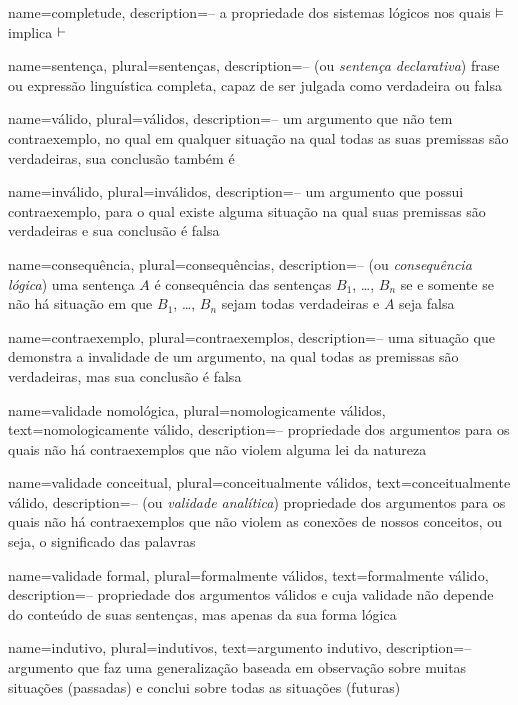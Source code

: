 {
 name=completude,
 description={-- a propriedade dos sistemas lógicos nos quais $\vDash $ implica $\vdash$}
}

{
 name=sentença,
 plural=sentenças,
 description={-- (ou \textit{sentença declarativa}) frase ou expressão linguística completa, capaz de ser julgada como verdadeira ou falsa}
}

{
 name=válido,
 plural=válidos,
 description={-- um argumento que não tem contraexemplo, no qual em qualquer situação na qual todas as suas premissas são verdadeiras, sua conclusão também é}
}

{
 name=inválido,
 plural=inválidos,
 description={-- um argumento que possui contraexemplo, para o qual existe alguma situação na qual suas premissas são verdadeiras e sua conclusão é falsa}
}

{
 name=consequência,
 plural=consequências,
 description={-- (ou \textit{consequência lógica}) uma sentença $A$ é consequência das sentenças $B_1$, \dots, $B_n$ se e somente se não há situação em que $B_1$, \dots, $B_n$ sejam todas verdadeiras e $A$ seja falsa}
}

{
 name=contraexemplo,
 plural=contraexemplos,
 description={-- uma situação que demonstra a invalidade de um argumento, na qual todas as premissas são verdadeiras, mas sua conclusão é falsa}
}

{
 name=validade nomológica,
 plural=nomologicamente válidos,
 text=nomologicamente válido,
 description={-- propriedade dos argumentos para os quais não há contraexemplos que não violem alguma lei da natureza}
}

{
 name=validade conceitual,
 plural=conceitualmente válidos,
 text=conceitualmente válido,
 description={-- (ou \textit{validade analítica}) propriedade dos argumentos para os quais não há contraexemplos que não violem as conexões de nossos conceitos, ou seja, o significado das palavras}
}

{
 name=validade formal,
 plural=formalmente válidos,
 text=formalmente válido,
 description={-- propriedade dos argumentos válidos e cuja validade não depende do conteúdo de suas sentenças, mas apenas da sua forma lógica}
}

{
 name=indutivo,
 plural=indutivos,
 text=argumento indutivo,
 description={-- argumento que faz uma generalização baseada em observação sobre muitas situações (passadas) e conclui sobre todas as situações (futuras)}
}


